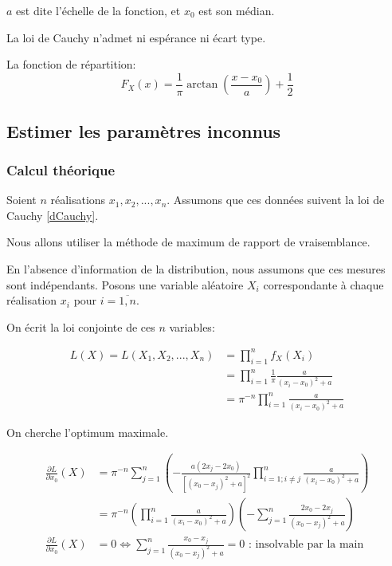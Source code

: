 \documentclass[12pt,a4paper,titlepage]{article}
\numberwithin{equation}{section}
\begin{document}
$a$ est dite l'échelle de la fonction, et $x_0$ est son médian.

La loi de Cauchy n'admet ni espérance ni écart type.

La fonction de répartition:
\begin{equation}
\label{rCauchy}
{F_X}\left( x \right) = \frac{1}{\pi }\arctan \left( {\frac{{x - {x_0}}}{a}} \right) + \frac{1}{2}
\end{equation}

\subsection{Estimer les paramètres inconnus}

\subsubsection*{Calcul théorique}

Soient $n$ réalisations $x_1, x_2, ..., x_n$. Assumons que ces données suivent la loi de Cauchy \eqref{dCauchy}.

Nous allons utiliser la méthode de maximum de rapport de vraisemblance.

En l'absence d'information de la distribution, nous assumons que ces mesures sont indépendants. Posons une variable aléatoire $X_i$ correspondante à chaque réalisation $x_i$ pour $i=\overline{1, n}$.

On écrit la loi conjointe de ces $n$ variables:

\begin{align*}
L (X) = L\left( {{X_1},{X_2},...,{X_n}} \right) & = \prod\limits_{i = 1}^n {{f_X}\left( {{X_i}} \right)} \\
& = \prod\limits_{i = 1}^n {\frac{1}{\pi }\frac{a}{{{{\left( {{x_i} - {x_0}} \right)}^2} + a}}} \\
& = {\pi ^{ - n}}\prod\limits_{i = 1}^n {\frac{a}{{{{\left( {{x_i} - {x_0}} \right)}^2} + a}}}
\end{align*}

On cherche l'optimum maximale.

\begin{align*}
\frac{{\partial L}}{{\partial {x_0}}}\left( X \right) & = {\pi ^{ - n}}\sum\limits_{j = 1}^n {\left( { - \frac{{a\left( {2{x_j} - 2{x_0}} \right)}}{{{{\left[ {{{\left( {{x_0} - {x_j}} \right)}^2} + a} \right]}^2}}}\prod\limits_{i = 1;i \ne j}^n {\frac{a}{{{{\left( {{x_i} - {x_0}} \right)}^2} + a}}} } \right)}\\
&  = {\pi ^{ - n}}\left( {\prod\limits_{i = 1}^n {\frac{a}{{{{\left( {{x_i} - {x_0}} \right)}^2} + a}}} } \right)\left( { - \sum\limits_{j = 1}^n {\frac{{2{x_0} - 2{x_j}}}{{{{\left( {{x_0} - {x_j}} \right)}^2} + a}}} } \right) \\
\frac{{\partial L}}{{\partial {x_0}}}\left( X \right) & = 0 \Leftrightarrow \sum\limits_{j = 1}^n {\frac{{{x_0} - {x_j}}}{{{{\left( {{x_0} - {x_j}} \right)}^2} + a}}}  = 0 \text{ : insolvable par la main}
\end{align*}
\end{document}
